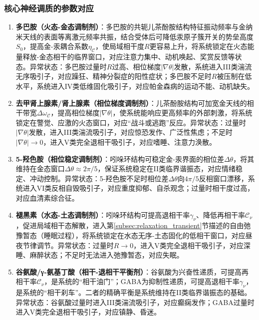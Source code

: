 \documentclass[12pt,a4paper,twocolumn]{article}
\begin{document}
\subsubsection{核心神经调质的参数对应}
\begin{enumerate}
\item \textbf{多巴胺（火态-金态调制剂）}：多巴胺的共轭儿茶酚胺结构特征振动频率与金纳米天线的表面等离激元频率共振，结合受体后可降低汞原子簇开关的势垒高度$S_0$，提高金-汞耦合系数$\eta_\mathcal{C}$，使局域相干度$R$更容易上升，将系统锁定在火态能量释放-金态相干的临界窗口，对应注意力集中、动机唤起、奖赏反馈等状态。异常状态：多巴胺过量时$R$过高、相位梯度$|\nabla\theta|$发散，系统进入III类湍流无序吸引子，对应躁狂、精神分裂症的阳性症状；多巴胺不足时$R$被压制在低水平，系统进入IV类低维固化吸引子，对应帕金森病的运动不能、动机缺失。

\item \textbf{去甲肾上腺素/肾上腺素（相位梯度调制剂）}：儿茶酚胺结构可加宽金天线的相干带宽$\Delta\omega_\mathcal{C}$，提高相位梯度$|\nabla\theta|$，使系统能响应更高频率的外部刺激，将系统锁定在警觉、应激的火态窗口，对应``战斗或逃跑''反应。异常状态：过量时$|\nabla\theta|$发散，进入III类湍流吸引子，对应惊恐发作、广泛性焦虑；不足时$|\nabla\theta|\to0$，进入V类完全退相干吸引子，对应嗜睡、注意力涣散。

\item \textbf{5-羟色胺（相位稳定调制剂）}：吲哚环结构可稳定金-汞界面的相位差$\Delta\theta$，将其维持在金态窗口$\Delta\theta\approx2\pi/5$，保证系统稳定在II类临界谐振态，对应情绪稳定、冲动控制。异常状态：5-羟色胺不足时相位差$\Delta\theta$向$4\pi/5$反相窗口漂移，系统进入VI类反相自毁吸引子，对应重度抑郁、自杀观念；过量时相干度过高，对应血清素综合征。

\item \textbf{褪黑素（水态-土态调制剂）}：吲哚环结构可提高退相干率$\gamma_\nu$、降低再相干率$\mathcal{C}_\nu$，促进局域相干态解散，进入第\ref{subsec:relaxation_transient}节描述的自由弛豫暂态（睡眠过程），将系统锁定在水态无序-土态固化的低相干窗口，对应昼夜节律调节。异常状态：过量时$R\to0$，进入V类完全退相干吸引子，对应深睡、麻醉状态；不足时无法进入弛豫暂态，对应失眠。

\item \textbf{谷氨酸/γ-氨基丁酸（相干-退相干平衡剂）}：谷氨酸为兴奋性递质，可提高再相干率$\mathcal{C}_\nu$，是系统的``相干油门''；GABA为抑制性递质，可提高退相干率$\gamma_\nu$，是系统的``相干刹车''。二者的精确平衡是系统维持在II类临界谐振态的基础。异常状态：谷氨酸过量时进入III类湍流吸引子，对应癫痫发作；GABA过量时进入V类完全退相干吸引子，对应镇静、昏迷。
\end{enumerate}
\end{document}
